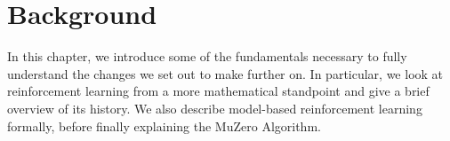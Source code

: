 \section{Background}
In this chapter, we introduce some of the fundamentals necessary to fully understand the changes we set out to make further on. In particular, we look at reinforcement learning from a more mathematical standpoint and give a brief overview of its history. We also describe model-based reinforcement learning formally, before finally explaining the MuZero Algorithm.







